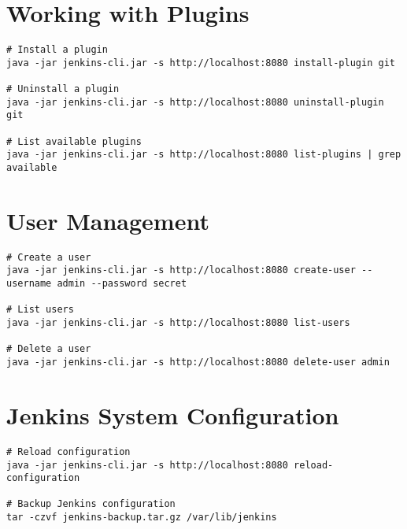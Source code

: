 \documentclass[11pt]{article}
\begin{document}
    \section*{Working with Plugins}
    \begin{lstlisting}[style=jenkinsStyle]
# Install a plugin
java -jar jenkins-cli.jar -s http://localhost:8080 install-plugin git

# Uninstall a plugin
java -jar jenkins-cli.jar -s http://localhost:8080 uninstall-plugin git

# List available plugins
java -jar jenkins-cli.jar -s http://localhost:8080 list-plugins | grep available
    \end{lstlisting}

    \section*{User Management}
    \begin{lstlisting}[style=jenkinsStyle]
# Create a user
java -jar jenkins-cli.jar -s http://localhost:8080 create-user --username admin --password secret

# List users
java -jar jenkins-cli.jar -s http://localhost:8080 list-users

# Delete a user
java -jar jenkins-cli.jar -s http://localhost:8080 delete-user admin
    \end{lstlisting}

    \section*{Jenkins System Configuration}
    \begin{lstlisting}[style=jenkinsStyle]
# Reload configuration
java -jar jenkins-cli.jar -s http://localhost:8080 reload-configuration

# Backup Jenkins configuration
tar -czvf jenkins-backup.tar.gz /var/lib/jenkins
    \end{lstlisting}
\end{document}
